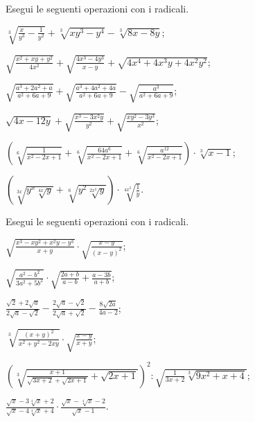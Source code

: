 \begin{esercizio}[\Ast]
 \label{ese:2.81}
Esegui le seguenti operazioni con i radicali.
 \begin{enumeratea}
 \item $\sqrt[3]{\frac x{y^3}-\frac 1{y^2}}+\sqrt[3]{xy^3-y^4}-\sqrt[3]{8x-8y}$;
 \item $\sqrt{\frac{x^2+xy+y^2}{4x^2}}+\sqrt{\frac{4x^3-4y^3}{x-y}}+\sqrt{4x^4+4x^3y+4x^2y^2}$;
 \item $\sqrt{\frac{a^3+2a^2+a}{a^2+6a+9}}+\sqrt{\frac{a^3+4a^2+4a}{a^2+6a+9}}-\sqrt{\frac{a^3}{a^2+6a+9}}$;
 \item $\sqrt{4x-12y}+\sqrt{\frac{x^3-3x^2y}{y^2}}+\sqrt{\frac{xy^2-3y^3}{x^2}}$;
 \item $\left(\sqrt[6]{\frac 1{x^2-2x+1}}+\sqrt[6]{\frac{64a^6}{x^2-2x+1}}+\sqrt[6]{\frac{a^{12}}{x^2-2x+1}}\right)\cdot \sqrt[3]{x-1}$;
 \item $\left(\sqrt[3x]{y^x\sqrt[4x]y}+\sqrt[6]{y^2\sqrt[2x^2]y}\right)\cdot \sqrt[4x^2]{\frac 1 y}$.
 \end{enumeratea}
\end{esercizio}

\begin{esercizio}[\Ast]
 \label{ese:2.82}
Esegui le seguenti operazioni con i radicali.
 \begin{enumeratea}
 \item $\sqrt{\frac{x^{3}-xy^{2}+x^{2}y-y^{3}}{x+y}}\cdot\sqrt{\frac{x-y}{(x-y)^{2}}}$;
 \item $\sqrt{\frac{a^{2}-b^{2}}{3a^{2}+5b^{2}}}\cdot\sqrt{\frac{2a+b}{a-b}+\frac{a-3b}{a+b}}$;
 \item $\frac{\sqrt{2}+2\sqrt{a}}{2\sqrt{a}-\sqrt{2}}-\frac{2\sqrt{a}-\sqrt{2}}{2\sqrt{a}+\sqrt{2}}-\frac{8\sqrt{2a}}{4a-2}$;
 \item $\sqrt[3]{\frac{(x+y)^{2}}{x^{2}+y^{2}-2xy}}\cdot\sqrt{\frac{x-y}{x+y}}$;
 \item $\left(\sqrt[3]{\frac{x+1}{\sqrt{3x+2}+\sqrt{2x+1}}+\sqrt{2x+1}}\right)^{2}:\sqrt{\frac{1}{3x+2}\sqrt[3]{9x^{2}+x+4}}$;
 \item $\frac{\sqrt{x}-3\sqrt[4]{x}+2}{\sqrt{x}-4\sqrt[4]{x}+4}\cdot\frac{\sqrt{x}-\sqrt[4]{x}-2}{\sqrt{x}-1}$.
 \end{enumeratea}
\end{esercizio}


